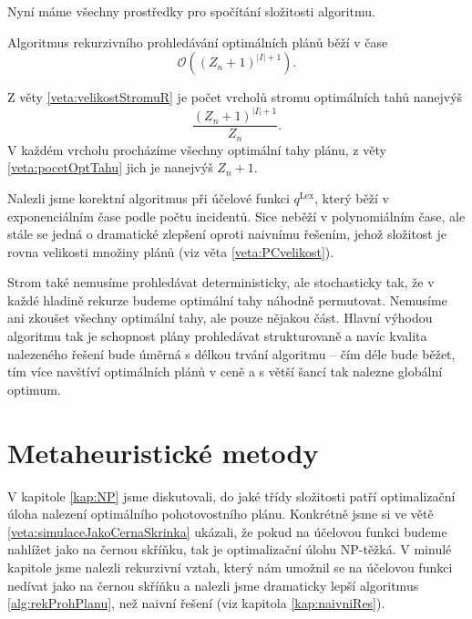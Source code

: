 Nyní máme všechny prostředky pro spočítání složitosti algoritmu.
\begin{veta}\label{veta:slozitostRek}
  Algoritmus rekurzivního prohledávání optimálních plánů běží v čase
  \begin{equation*}
    \mathcal{O}((Z_n + 1)^{|I| + 1}).
  \end{equation*}
\end{veta}
\begin{dukaz}
  Z věty \ref{veta:velikostStromuR} je počet vrcholů stromu optimálních tahů nanejvýš
  \begin{equation*}
    \frac{(Z_n + 1)^{|I| + 1}}{Z_n}.
  \end{equation*}
  V každém vrcholu procházíme všechny optimální tahy plánu, z věty \ref{veta:pocetOptTahu} jich je nanejvýš $Z_n + 1$.
\end{dukaz}

Nalezli jsme korektní algoritmus při účelové funkci $q^{\text{Lex}}$, který běží v exponenciálním čase podle počtu incidentů. 
Sice neběží v polynomiálním čase, ale stále se jedná o dramatické zlepšení oproti naivnímu řešením, jehož složitost je rovna velikosti množiny plánů (viz věta \ref{veta:PCvelikost}).

Strom také nemusíme prohledávat deterministicky, ale stochasticky tak, že v každé hladině rekurze budeme optimální tahy náhodně permutovat. Nemusíme ani zkoušet všechny optimální tahy,
ale pouze nějakou část. Hlavní výhodou algoritmu tak je schopnost plány prohledávat strukturovaně a navíc kvalita nalezeného řešení bude úměrná s délkou trvání algoritmu
-- čím déle bude běžet, tím více navštíví optimálních plánů v ceně a s větší šancí tak nalezne globální optimum.

\section{Metaheuristické metody}\label{kap:heuristiky}

V kapitole \ref{kap:NP} jsme diskutovali, do jaké třídy složitosti patří optimalizační úloha nalezení optimálního pohotovostního plánu.
Konkrétně jsme si ve větě \ref{veta:simulaceJakoCernaSkrinka} ukázali, že pokud na účelovou funkci budeme nahlížet jako na černou skříňku,
tak je optimalizační úlohu NP-těžká. V minulé kapitole jsme nalezli rekurzivní vztah, který nám umožnil se na
účelovou funkci nedívat jako na černou skříňku a nalezli jsme dramaticky lepší algoritmus \ref{alg:rekProhPlanu}, než naivní řešení (viz kapitola \ref{kap:naivniRes}).

